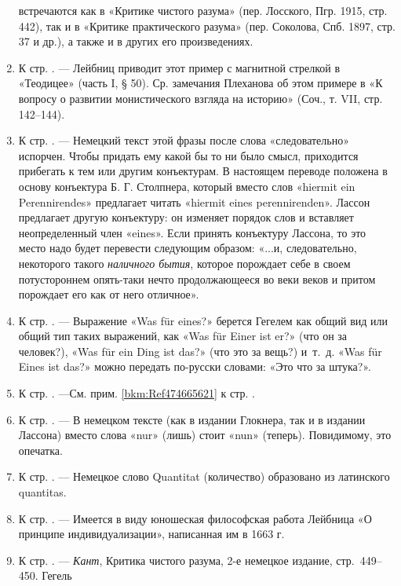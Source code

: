 \begin{enumerate}
встречаются как в «Критике чистого разума» (пер. Лосского, Пгр. 1915, стр.
442), так и в «Критике практического разума» (пер. Соколова, Спб. 1897,
стр. 37 и др.), а также и в других его произведениях.
\item \label{bkm:Ref474665621}К стр. \pageref{bkm:bm31}. — Лейбниц приводит
этот пример с магнитной стрелкой в «Теодицее» (часть I, § 50). Ср.
замечания Плеханова об этом примере в «К вопросу о развитии монистического
взгляда на историю» (Соч., т. VII, стр. 142–144).
\item \label{bkm:Ref474665661}К стр. \pageref{bkm:bm32}. — Немецкий текст
этой фразы после слова «следовательно» испорчен. Чтобы придать ему какой бы
то ни было смысл, приходится прибегать к тем или другим конъектурам. В
настоящем переводе положена в основу конъектура Б. Г. Столпнера, который
вместо слов «hiermit ein Perennirendes» предлагает читать «hiermit eines
perennirenden». Лассон предлагает другую конъектуру: он изменяет порядок
слов и вставляет неопределенный член «eines». Если принять конъектуру
Лассона, то это место надо будет перевести следующим образом: «...и,
следовательно, некоторого такого {\em наличного бытия}, которое
порождает себе в своем потустороннем опять-таки нечто продолжающееся во
веки веков и притом порождает его как от него отличное».
\item \label{bkm:Ref474665685}К стр. \pageref{bkm:bm33}. — Выражение «Was
für eines?» берется Гегелем как общий вид или общий тип таких выражений,
как «Was für Einer ist er?» (что он за человек?), «Was für ein Ding ist
das?» (что это за вещь?) и~т.~д. «Was für Eines ist das?» можно передать
по-русски словами: «Это что за штука?».
\item \label{bkm:Ref474665698}К стр. \pageref{bkm:bm34}. —См. прим.
\ref{bkm:Ref474665621} к стр. \pageref{bkm:bm31}.
\item \label{bkm:Ref474665714}К стр. \pageref{bkm:bm35}. — В немецком тексте
(как в издании Глокнера, так и в издании Лассона) вместо слова «nur» (лишь)
стоит «nun» (теперь). Повидимому, это опечатка.
\item \label{bkm:Ref474665735}К стр. \pageref{bkm:bm36}. — Немецкое слово
Quantitat (количество) образовано из латинского quantitas.
\item \label{bkm:Ref474665753}К стр. \pageref{bkm:bm37}. — Имеется в виду
юношеская философская работа Лейбница «О принципе индивидуализации»,
написанная им в 1663 г.
\item \label{bkm:Ref474665775}К стр. \pageref{bkm:bm38}. — {\em Кант},
Критика чистого разума, 2-е немецкое издание, стр.~449–450. Гегель

\end{enumerate}
